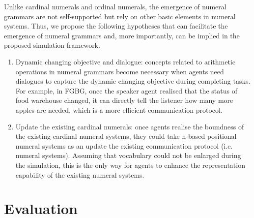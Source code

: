 \documentclass[a4paper,11pt]{article}
\begin{document}
Unlike cardinal numerals and ordinal numerals, the emergence of numeral grammars are not self-supported but rely on other basic elements in numeral systems. Thus, we propose the following hypotheses that can facilitate the emergence of numeral grammars and, more importantly, can be implied in the proposed simulation framework.

\begin{enumerate}
  \item Dynamic changing objective and dialogue: concepts related to arithmetic operations in numeral grammars become necessary when agents need dialogues to capture the dynamic changing objective during completing tasks. For example, in FGBG, once the speaker agent realised that the status of food warehouse changed, it can directly tell the listener how many more apples are needed, which is a more efficient communication protocol.
  \item Update the existing cardinal numerals: once agents realise the boundness of the existing cardinal numeral systems, they could take n-based positional numeral systems as an update the existing communication protocol (i.e. numeral systems). Assuming that vocabulary could not be enlarged during the simulation, this is the only way for agents to enhance the representation capability of the existing numeral systems.
\end{enumerate}


\section{Evaluation}
\label{sec:4evaluaion}
\end{document}

